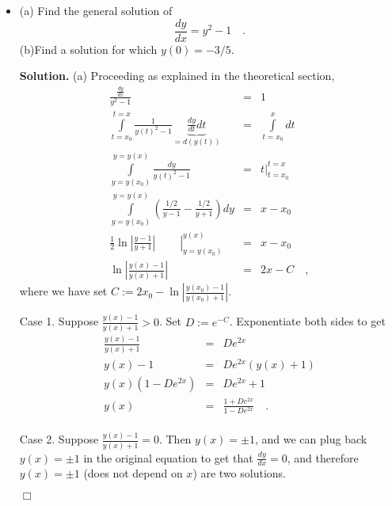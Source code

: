 \documentclass[12pt]{book}
\newenvironment{solution}{\textbf{Solution.} }{$\Box$}
\begin{document}
\begin{itemize}
\item (a) Find the general solution of
\[
\frac{dy}{dx}= y^2-1\quad .
\]
(b)Find a solution for which $y(0)=-3/5$.

\begin{solution}
(a) Proceeding as explained in the theoretical section,
\[
\begin{array}{rcl}
\frac{\frac{dy}{dx}}{y^2-1}&=&1 \\
\displaystyle\int\limits_{t=x_0}^{t=x} \frac{1}{ y(t)^2-1}\underbrace{\frac{dy}{dt}dt}_{=d(y(t))}&=&\displaystyle\int\limits_{t=x_0}^{x}dt \\
\displaystyle\int\limits_{y=y(x_0) }^{y=y(x)} \frac{dy}{ y(t)^2-1}& =& \displaystyle\left.t \right|_{ t=x_0}^{t=x} \\
\displaystyle\int\limits_{y=y(x_0)}^{y=y(x)} \left(\frac{1/2 }{y-1}- \frac{1/2}{y+1}\right)dy&=& x-x_0\\
\displaystyle\left .\frac{1}2 \ln \left|\frac{y-1}{y+1}\right|~~~~~~~~~~\right|_{y=y(x_0)}^{y(x)}&=& x-x_0\\
\displaystyle\ln \left|\frac{y(x)-1}{y(x)+1}\right|&=& 2x - C\quad ,
\end{array}
\]
where we have set $C:=2x_0-  \ln \left|\frac{y(x_0)-1}{y(x_0)+1}\right|$. 

Case 1. Suppose $\frac{y(x)-1}{y(x)+1}>0$. Set $D:=e^{-C}$. Exponentiate both sides to get 
\[
\begin{array}{rcl}
\frac{y(x)-1}{y(x)+1}&=& D e^{2x}\\
y(x)-1&=& De^{2x}(y(x)+1)\\
y(x)(1- De^{2x})&=& De^{2x}+1\\
y(x)&=&\frac{ 1+De^{2x}}{1- De^{2x}}\quad .\\
\end{array}
\]

Case 2.  Suppose $\frac{y(x)-1}{y(x)+1}=0$. Then $y(x)=\pm 1$, and we can plug back $y(x)=\pm 1$ in the original equation to get that $\frac{dy}{dx}= 0$, and therefore $y(x)= \pm 1$ (does not depend on $x$) are two solutions.


\end{solution}
\end{itemize}
\end{document}
